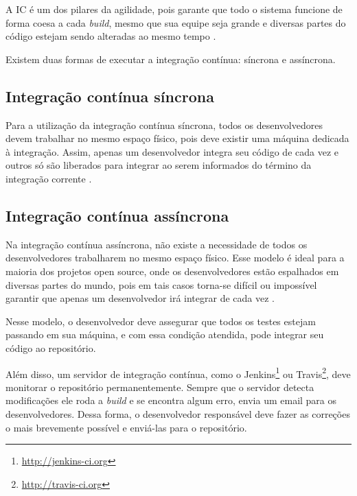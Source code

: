 A IC é um dos pilares da agilidade, pois garante que todo o sistema funcione de forma coesa a cada \textit{build}, mesmo que sua equipe seja grande e diversas partes do código estejam sendo alteradas ao mesmo tempo \cite{CaelumCI}.

Existem duas formas de executar a integração contínua: síncrona e assíncrona.

\subsection{Integração contínua síncrona} %
\label{sub:integracao_continua_sincrona}

Para a utilização da integração contínua síncrona, todos os desenvolvedores devem trabalhar no mesmo espaço físico, pois deve existir uma máquina dedicada à integração. Assim, apenas um desenvolvedor integra seu código de cada vez e outros só são liberados para integrar ao serem informados do término da integração corrente \cite{ImproveitCI}.



\subsection{Integração contínua assíncrona} %
\label{sub:integracao_continua_assincrona}

Na integração contínua assíncrona, não existe a necessidade de todos os desenvolvedores trabalharem no mesmo espaço físico. Esse modelo é ideal para a maioria dos projetos open source, onde os desenvolvedores estão espalhados em diversas partes do mundo, pois em tais casos torna-se difícil ou impossível garantir que apenas um desenvolvedor irá integrar de cada vez \cite{ImproveitCI}.

Nesse modelo, o desenvolvedor deve assegurar que todos os testes estejam passando em sua máquina, e com essa condição atendida, pode integrar seu código ao repositório.

Além disso, um servidor de integração contínua, como o Jenkins\footnote{\url{http://jenkins-ci.org}} ou Travis\footnote{\url{http://travis-ci.org}}, deve monitorar o repositório permanentemente. Sempre que o servidor detecta modificações ele roda a \textit{build} e se encontra algum erro, envia um email para os desenvolvedores. Dessa forma, o desenvolvedor responsável deve fazer as correções o mais brevemente possível e enviá-las para o repositório.


